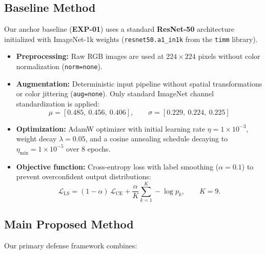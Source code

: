 \documentclass[11pt,a4paper]{article}
\begin{document}
\subsection{Baseline Method}
Our anchor baseline (\textbf{EXP-01}) uses a standard \textbf{ResNet-50} architecture
initialized with ImageNet-1k weights (\texttt{resnet50.a1\_in1k} from the
\texttt{timm} library).
\begin{itemize}
  \item \textbf{Preprocessing:} Raw RGB images are used at $224\times224$ pixels
        without color normalization (\texttt{norm=none}).
  \item \textbf{Augmentation:} Deterministic input pipeline without spatial
        transformations or color jittering (\texttt{aug=none}). Only standard
        ImageNet channel standardization is applied:
        \begin{equation}
          \mu = [0.485,\ 0.456,\ 0.406], \qquad
          \sigma = [0.229,\ 0.224,\ 0.225]
        \end{equation}
  \item \textbf{Optimization:} AdamW optimizer with initial learning rate
        $\eta = 1\times10^{-3}$, weight decay $\lambda = 0.05$, and a cosine
        annealing schedule decaying to $\eta_{\min} = 1\times10^{-5}$ over 8 epochs.
  \item \textbf{Objective function:} Cross-entropy loss with label smoothing
        ($\alpha = 0.1$) to prevent overconfident output distributions:
        \begin{equation}
          \mathcal{L}_{\text{LS}} = (1-\alpha)\,\mathcal{L}_{\text{CE}}
            + \frac{\alpha}{K}\sum_{k=1}^{K} -\log p_k,
          \qquad K = 9 .
        \end{equation}
\end{itemize}

\subsection{Main Proposed Method}
Our primary defense framework combines:
\end{document}

